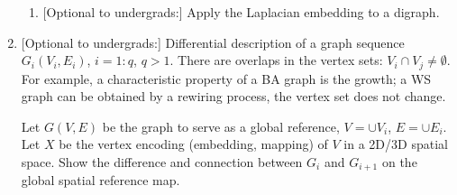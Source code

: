 \begin{enumerate}
\begin{enumerate}
  \item {[Optional to undergrads:] } Apply the Laplacian embedding to
    a digraph. 
    
  \end{enumerate}



\item {[Optional to undergrads:] } Differential description of a graph
  sequence $G_i(V_i,E_i)$, $i=1:q$, $q>1$. There are overlaps in the
  vertex sets: $V_{i} \cap V_{j} \neq \emptyset$. For example, a
  characteristic property of a BA graph is the growth; a WS graph can
  be obtained by a rewiring process, the vertex set does not change.

  Let $G(V,E)$ be the graph to serve as a global reference,
  $V = \cup V_i$, $E = \cup E_i$.  Let $X$ be the vertex encoding
  (embedding, mapping) of $V$ in a 2D/3D spatial space.  Show the
  difference and connection between $G_i$ and $G_{i+1}$ on the global
  spatial reference map. 

\end{enumerate}


